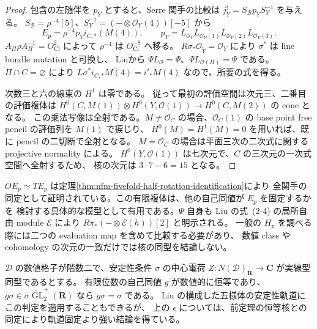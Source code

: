 \begin{proof}
包含の左随伴を $p_Y$ とすると、Serre 関手の比較は
$j_Y^!=S_{\mathcal B}p_YS_Y^{-1}$ を与える。
$S_{\mathcal B}=\rho^{-4}[5]$、$S_Y^{-1}=(-\otimes\mathcal O_Y(4))[-5]$ から
\[
 E_p=\rho^{-4}p_Yi_{C,*}(M(4)),\qquad
 p_Y=L_{\mathcal O_Y}L_{\mathcal O_Y(1)}L_{\mathcal O_Y(2)}L_{\mathcal O_Y(3)}.
\]
$A_\Pi\rho A_\Pi^{-1}=O_{\mathrm{Cl}}^2$ によって $\rho^{-4}$ は $O_{\mathrm{Cl}}^{-8}$ へ移る。
$R\sigma_*\mathcal O_{\widetilde Y}=\mathcal O_Y$ により $\sigma^*$ は line bundle mutation と可換し、
Liu\cite[Lemma~2.12]{NFMPeizeLiuFivefold}から
$\Psi L_{\mathcal O}=\Psi$、$\Psi L_{\mathcal O(H)}=\Psi$ である。
$\Pi\cap C=\varnothing$ により $L\sigma^*i_{C,*}M(4)=i'_*M(4)$ なので、所要の式を得る。

次数三と六の線束の $H^1$ は零である。
従って最初の評価空間は次元三、二番目の評価複体は
$H^0(C,M(1))\otimes H^0(Y,\mathcal O(1))\to H^0(C,M(2))$ の cone となる。
この乗法写像は全射である。$M\ne\mathcal O_C$ の場合、$\mathcal O_C(1)$ の
base point free pencil の評価列を $M(1)$ で捩じり、
$H^0(M)=H^1(M)=0$ を用いれば、既に pencil の二切断で全射となる。
$M=\mathcal O_C$ の場合は平面三次の二次式に関する projective normality による。
$H^0(Y,\mathcal O(1))$ は七次元で、$C$ の三次元の一次式空間へ全射するため、
核の次元は $3\cdot7-6=15$ となる。
\end{proof}

$OE_p\simeq TE_p$ は定理\ref{thm:nfm-fivefold-half-rotation-identification}により
全関手の同定として証明されている。この有限複体は、他の自己同値が $E_p$ を固定するかを
検討する具体的な模型として有用である。$\Psi$ 自身も Liu の式~(2-4) の局所自由 module
$\mathcal E$ により $R\pi_*(-\otimes\mathcal E(h))[2]$ と明示される。
一般の $H_p$ を調べる際には二つの evaluation map を含めて比較する必要があり、
数値 class や cohomology の次元の一致だけでは核の同型を結論しない。

\begin{proposition}[安定性軌道上の有限数値的自己同値]
\label{prop:nfm-fivefold-finite-stability-fixed}
$\mathcal D$ の数値格子が階数二で、安定性条件 $\sigma$ の中心電荷
$Z:N(\mathcal D)_{\mathbf R}\to\mathbf C$ が実線型同型であるとする。
有限位数の自己同値 $g$ が数値的に恒等であり、
$g\sigma\in\sigma\widetilde{\operatorname{GL}}_2^+(\mathbf R)$ なら $g\sigma=\sigma$ である。
Liu の構成した五様体の安定性軌道にこの判定を適用することもできるが、
上の $\epsilon$ については、前定理の恒等核との同定により軌道固定より強い結論を得ている。
\end{proposition}

